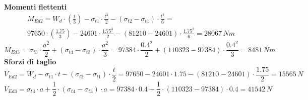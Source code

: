 \textbf{Momenti flettenti}
\begin{equation*}
    \begin{split}
    M_{Ed2} = W_d \cdot (\frac{t}{3}) - \sigma_{t1} \cdot \frac{t^3}{2} - (\sigma_{t2} - \sigma_{t1}) \cdot \frac{t^2}{6} = \\
    97650 \cdot (\frac{1.75}{3}) - 24601 \cdot \frac{1.75^3}{2} - (81210 - 24601) \cdot \frac{1.75^2}{6} = 28067 \,Nm
    \end{split}
\end{equation*}
\begin{equation*}
    M_{Ed3} = \sigma_{t3} \cdot \frac{a^2}{2} + (\sigma_{t4} - \sigma_{t3}) \cdot \frac{a^2}{3} = 97384 \cdot \frac{0.4^2}{2} + (110323 - 97384) \cdot \frac{0.4^2}{3} = 8481 \,Nm
\end{equation*}
\textbf{Sforzi di taglio}
\begin{equation*}
    V_{Ed2} = W_d - \sigma_{t1} \cdot t - (\sigma_{t2} - \sigma_{t1}) \cdot \frac{t}{2} = 97650 - 24601 \cdot 1.75 - (81210 - 24601) \cdot \frac{1.75}{2}  = 15565 \,N
\end{equation*}
\begin{equation*}
    V_{Ed3} = \sigma_{t3} \cdot a + \frac{1}{2} \cdot (\sigma_{t4} - \sigma_{t3}) \cdot a = 97384 \cdot 0.4 + \frac{1}{2} \cdot (110323 - 97384) \cdot 0.4 =  41542 \,N
\end{equation*}


